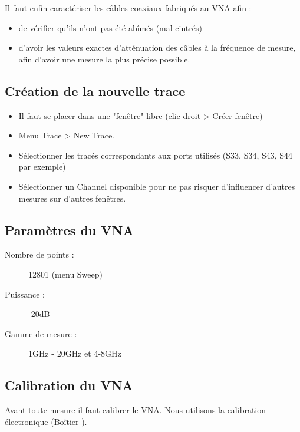 Il faut enfin caractériser les câbles coaxiaux fabriqués au VNA afin :
\begin{itemize}
    \item de vérifier qu'ils n'ont pas été abîmés (mal cintrés)
    \item d'avoir les valeurs exactes d'atténuation des câbles à la fréquence de mesure, afin d'avoir une mesure la plus précise possible.
\end{itemize}

\subsection{Création de la nouvelle trace}
\begin{itemize}
    \item Il faut se placer dans une "fenêtre" libre (clic-droit > Créer fenêtre)
    \item Menu Trace > New Trace.
    \item Sélectionner les tracés correspondants aux ports utilisés (S33, S34, S43, S44 par exemple)
    \item Sélectionner un Channel disponible pour ne pas risquer d'influencer d'autres mesures sur d'autres fenêtres.
\end{itemize}

\subsection{Paramètres du VNA}
\begin{description}
    \item[Nombre de points :] 12801 (menu Sweep)
    \item[Puissance :] -20dB %
    \item[Gamme de mesure :] 1GHz - 20GHz et 4-8GHz
\end{description}

\subsection{Calibration du VNA}
Avant toute mesure il faut calibrer le VNA. Nous utilisons la calibration électronique (Boîtier%
).
